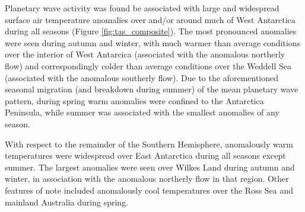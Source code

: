 Planetary wave activity was found be associated with large and widespread surface air temperature anomalies over and/or around much of West Antarctica during all seasons (Figure \ref{fig:tas_composite}). The most pronounced anomalies were seen during autumn and winter, with much warmer than average conditions over the interior of West Antarcica (associated with the anomalous northerly flow) and correspondingly colder than average conditions over the Weddell Sea (associated with the anomalous southerly flow). Due to the aforementioned seasonal migration (and breakdown during summer) of the mean planetary wave pattern, during spring warm anomalies were confined to the Antarctica Peninsula, while summer was associated with the smallest anomalies of any season.  

With respect to the remainder of the Southern Hemisphere, anomalously warm temperatures were widespread over East Antarctica during all seasons except summer. The largest anomalies were seen over Wilkes Land during autumn and winter, in association with the anomalous northerly flow in that region. Other features of note included anomalously cool temperatures over the Ross Sea and mainland Australia during spring.
